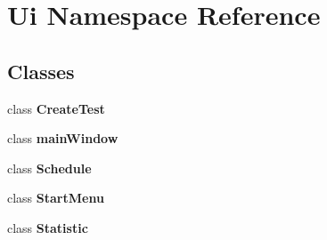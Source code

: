 \section{Ui Namespace Reference}
\label{namespace_ui}
\subsection*{Classes}
\begin{DoxyCompactItemize}
\item 
class {\bf Create\-Test}
\item 
class {\bf main\-Window}
\item 
class {\bf Schedule}
\item 
class {\bf Start\-Menu}
\item 
class {\bf Statistic}
\end{DoxyCompactItemize}
